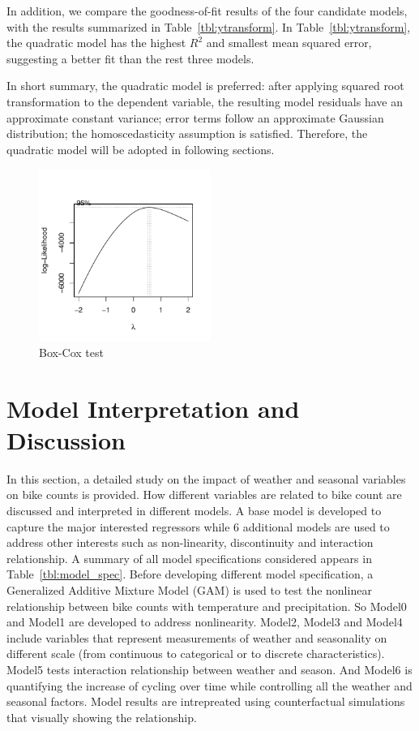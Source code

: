 \documentclass [11pt, proquest] {uwthesis}[2015/03/03]
\begin{document}
In addition, we compare the goodness-of-fit results of the four candidate models, with the results summarized in Table~\ref{tbl:ytransform}. In Table~\ref{tbl:ytransform}, the quadratic model has the highest $R^2$ and smallest mean squared error, suggesting a better fit than the rest three models.

In short summary, the quadratic model is preferred: after applying squared root transformation to the dependent variable, the resulting model residuals have an approximate constant variance; error terms follow an approximate Gaussian distribution; the homoscedasticity assumption is satisfied. Therefore, the quadratic model will be adopted in following sections. 


\begin{figure}
\centering
   \includegraphics[width=0.5\textwidth]{figures/boxcox} 
  \caption{Box-Cox test }
  \label{fig:boxcox}
\end{figure}

\section{Model Interpretation and Discussion}
\label{sec:intrepofresult}

In this section, a detailed study on the impact of weather and seasonal variables on bike counts is provided. How different variables are related to bike count are discussed and interpreted in different models. A base model is developed to capture the major interested regressors while 6 additional models are used to address other interests such as non-linearity, discontinuity and interaction relationship. A summary of all model specifications considered appears in Table~\ref{tbl:model_spec}. Before developing different model specification, a Generalized Additive Mixture Model (GAM) is used to test the nonlinear relationship between bike counts with temperature and precipitation. So Model0 and Model1 are developed to address nonlinearity. Model2, Model3 and Model4 include variables that represent measurements of weather and seasonality on different scale (from continuous to categorical or to discrete characteristics). Model5 tests interaction relationship between weather and season. And Model6 is quantifying the increase of cycling over time while controlling all the weather and seasonal factors. Model results are intrepreated using counterfactual simulations that visually showing the relationship. 
\end{document}
